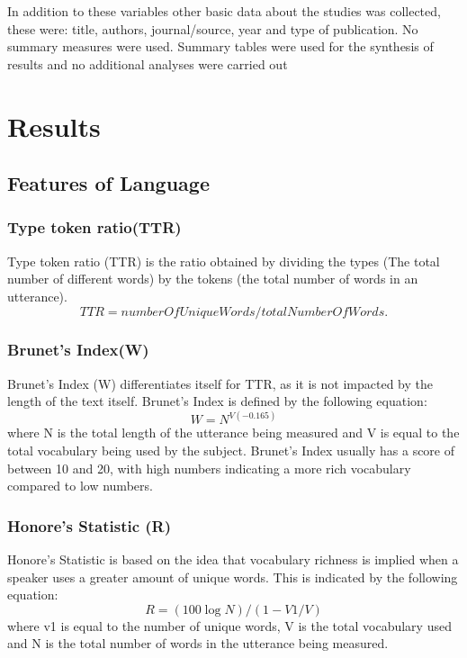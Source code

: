 \documentclass[12pt]{article}
\begin{document}
In addition to these variables other basic data about the studies was collected, these were: title, authors, journal/source, year and type of publication. No summary measures were used. Summary tables were used for the synthesis of results and no additional analyses were carried out

\section{Results}\label{results}
\subsection{Features of Language}
\subsubsection{Type token ratio(TTR)}
Type token ratio (TTR) is the ratio obtained by dividing the types (The total number of different words) by the tokens (the total number of words in an utterance).
\begin{equation} \label{x1}
TTR = numberOfUniqueWords / totalNumberOfWords.
\end{equation}
\subsubsection{Brunet's Index(W)} %
Brunet's Index (W) differentiates itself for TTR, as it is not impacted by the length of the text itself. Brunet's Index is defined by the following equation:
\begin{equation} \label{x2}
W = N^{V(-0.165)}
\end{equation}
where N is the total length of the utterance being measured and V is equal to the total vocabulary being used by the subject. Brunet's Index usually has a score of between 10 and 20, with high numbers indicating a more rich vocabulary compared to low numbers. \newline
\par 
\subsubsection{Honore's Statistic (R)} %
Honore's Statistic is based on the idea that vocabulary richness is implied when a speaker uses a greater amount of unique words. This is indicated by the following equation: 
\begin{equation} \label{x3}
R = (100 \log N) / (1 - V1/V)
\end{equation}
where v1 is equal to the number of unique words, V is the total vocabulary used and N is the total number of words in the utterance being measured.
\end{document}

